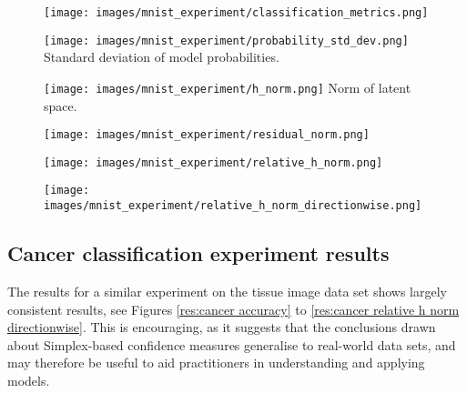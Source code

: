 \documentclass{article}
\begin{document}
\begin{figure}[h]
\centering
\begin{minipage}{.25\textwidth}
  \centering
  \texttt{[image: images/mnist\_experiment/classification\_metrics.png]}
  \label{res:mnist accuracy}
\end{minipage}%
\hspace{.05\textwidth}
\begin{minipage}{.25\textwidth}
  \centering
  \texttt{[image: images/mnist\_experiment/probability\_std\_dev.png]}
  {Standard deviation of model probabilities.}
  \label{res:mnist prob std}
\end{minipage}
\begin{minipage}{.25\textwidth}
  \centering
  \texttt{[image: images/mnist\_experiment/h\_norm.png]}
  {Norm of latent space.}
  \label{res:mnist h norm}
\end{minipage}
\end{figure}


\begin{figure}[h]
\centering
\begin{minipage}{.25\textwidth}
  \centering
  \texttt{[image: images/mnist\_experiment/residual\_norm.png]}
  \label{res:mnist r norm}
\end{minipage}%
\hspace{.05\textwidth}
\begin{minipage}{.25\textwidth}
  \centering
  \texttt{[image: images/mnist\_experiment/relative\_h\_norm.png]}
  \label{res:mnist relative h norm}
\end{minipage}
\begin{minipage}{.25\textwidth}
  \centering
  \texttt{[image: images/mnist\_experiment/relative\_h\_norm\_directionwise.png]}
  \label{res:mnist relative h norm directionwise}
\end{minipage}
\end{figure}





\subsection{Cancer classification experiment results}
\label{sec:cancer results}
The results for a similar experiment on the tissue image data set shows largely consistent results, see Figures \ref{res:cancer accuracy} to \ref{res:cancer relative h norm directionwise}. This is encouraging, as it suggests that the conclusions drawn about Simplex-based confidence measures generalise to real-world data sets, and may therefore be useful to aid practitioners in understanding and applying models.
\end{document}
